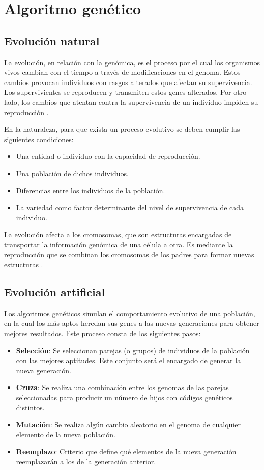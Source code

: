 \chapter{Algoritmo genético}

\section{Evolución natural}

La evolución, en relación con la genómica, es el proceso por el cual los organismos vivos cambian con el tiempo a través de modificaciones en el genoma. Estos cambios provocan individuos con rasgos alterados que afectan su supervivencia. Los supervivientes se reproducen y transmiten estos genes alterados. Por otro lado, los cambios que atentan contra la supervivencia de un individuo impiden su reproducción \cite{evolucion}.

En la naturaleza, para que exista un proceso evolutivo se deben cumplir las siguientes condiciones:
\begin{itemize}
	\item Una entidad o individuo con la capacidad de reproducción.
	\item Una población de dichos individuos.
	\item Diferencias entre los individuos de la población.
	\item La variedad como factor determinante del nivel de supervivencia de cada individuo.
\end{itemize}

La evolución afecta a los cromosomas, que son estructuras encargadas de transportar la información genómica de una célula a otra. Es mediante la reproducción que se combinan los cromosomas de los padres para formar nuevas estructuras \cite{evolucion_2, cromosoma}.

\section{Evolución artificial}

Los algoritmos genéticos simulan el comportamiento evolutivo de una población, en la cual los más aptos heredan sus genes a las nuevas generaciones para obtener mejores resultados. Este proceso consta de los siguientes pasos:
\begin{itemize}
	\item \textbf{Selección}: Se seleccionan parejas (o grupos) de individuos de la población con las mejores aptitudes. Este conjunto será el encargado de generar la nueva generación.
	
	\item \textbf{Cruza}: Se realiza una combinación entre los genomas de las parejas seleccionadas para producir un número de hijos con códigos genéticos distintos.
	
	\item \textbf{Mutación}: Se realiza algún cambio aleatorio en el genoma de cualquier elemento de la nueva población.
	
	\item \textbf{Reemplazo}: Criterio que define qué elementos de la nueva generación reemplazarán a los de la generación anterior.
\end{itemize}

